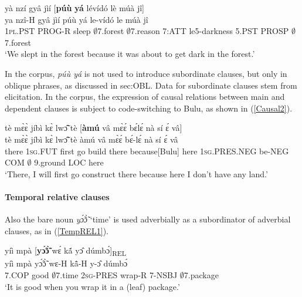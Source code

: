 \begin{exe}
\ex\label{Causal1}
  \glll yà nzí gyâ jìí [{\bfseries púù} {\bfseries yá} lévídó lè múà jî] \\
        ya nzî-H gyâ jìí púù yá le-vídó le múà jî \\
         1\textsc{pl}.PST PROG-R sleep $\emptyset$7.forest $\emptyset$7.reason 7:ATT le5-darkness 5.PST PROSP $\emptyset$7.forest \\
    \trans `We slept in the forest because it was about to get dark in the forest.'
\end{exe}

In the corpus, {\itshape púù yá} is not used to introduce subordinate clauses, but only in oblique phrases, as discussed in {sec:OBL}. Data for subordinate clauses stem from elicitation. In the corpus, the expression of causal relations between main and dependent clauses is subject to code-switching to Bulu, as shown in (\ref{Causal2}).

\begin{exe} 
\ex\label{Causal2}
  \glll   tè mɛ̀ɛ̀ jíbì kɛ̀ lwɔ̃̂ tè [{\bfseries àmú} vâ mɛ̀ɛ́ bɛ́lɛ́ nà sí ɛ́ vâ] \\
          tè mɛ̀ɛ̀ jíbì kɛ̀ lwɔ̃̂ tè àmú vâ mɛ̀ɛ́ bɛ́-lɛ́ nà sí ɛ́ vâ \\
           there 1\textsc{sg}.FUT first go build there because[Bulu] here 1\textsc{sg}.PRES.NEG be-NEG COM $\emptyset$
9.ground LOC here \\
    \trans `There, I will first go construct there because here I don't have any land.'
\end{exe}

\paragraph{Temporal relative clauses} Also the bare noun {\itshape yɔ̃́ɔ̃̀} `time' is used adverbially as a subordinator of adverbial clauses, as in (\ref{TempREL1}).

\begin{exe} 
\ex\label{TempREL1}
  \glll yíì mpà [{\bfseries yɔ̃́ɔ̃̀} wɛ́ kã́ yɔ̂ dúmbɔ́]\textsubscript{REL} \\
       yíì mpà yɔ̃́ɔ̃̀ wɛ-H kã̂-H y-ɔ̂ dúmbɔ́ \\
         7.COP good $\emptyset$7.time 2\textsc{sg}-PRES wrap-R 7-NSBJ $\emptyset$7.package\\ 
    \trans `It is good when you wrap it in a (leaf) package.'
\end{exe}












